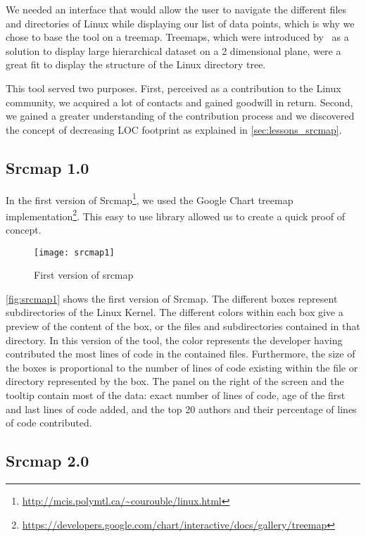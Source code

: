 We needed an interface that would allow the user to navigate the different files and directories of Linux while displaying our list of data points, which is why we chose to base the tool on a treemap. Treemaps, which were introduced by~\citep{Bederson-2002} as a solution to display large hierarchical dataset on a 2 dimensional plane, were a great fit to display the structure of the Linux directory tree. 

This tool served two purposes. First, perceived as a contribution to the Linux community, we acquired a lot of contacts and gained goodwill in return. Second, we gained a greater understanding of the contribution process and we discovered the concept of decreasing \ac{LOC} footprint as explained in \autoref{sec:lessons_srcmap}.

\subsection{Srcmap 1.0}

In the first version of Srcmap\footnote{\url{http://mcis.polymtl.ca/~courouble/linux.html}}, we used the Google Chart treemap implementation\footnote{\url{https://developers.google.com/chart/interactive/docs/gallery/treemap}}. This easy to use library allowed us to create a quick proof of concept. 

\begin{figure}[htb]
\centering
\texttt{[image: srcmap1]}
\caption{First version of srcmap}
\label{fig:srcmap1}
\end{figure}

\autoref{fig:srcmap1} shows the first version of Srcmap. The different boxes represent subdirectories of the Linux Kernel. The different colors within each box give a preview of the content of the box, or the files and subdirectories contained in that directory. In this version of the tool, the color represents the developer having contributed the most lines of code in the contained files. Furthermore, the size of the boxes is proportional to the number of lines of code existing within the file or directory represented by the box. The panel on the right of the screen and the tooltip contain most of the data: exact number of lines of code, age of the first and last lines of code added, and the top 20 authors and their percentage of lines of code contributed.


\subsection{Srcmap 2.0}

